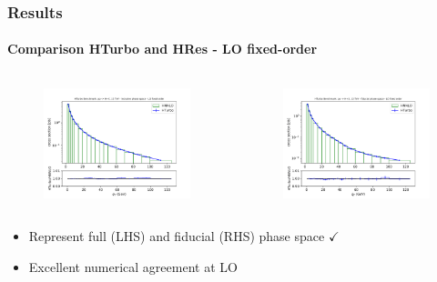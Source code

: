 \documentclass[aspectratio=43]{beamer}
\begin{document}
\begin{frame}

	\frametitle{Results}
	\framesubtitle{Comparison HTurbo and HRes - LO fixed-order}
	
	\begin{columns}
		
		
		\begin{figure}
			\includegraphics[width = 7cm]{plots/part3/chapter6/nlo-fo-1.png}
		\end{figure}
		
		
		\begin{figure}
			\includegraphics[width = 7cm]{plots/part3/chapter6/nlo-fo-fid-1.png}
		\end{figure}
		
	\end{columns}
	
	\begin{itemize}
		\item \footnotesize Represent full (LHS) and fiducial (RHS) phase space {\color{darkgreen}$\checkmark$} 
		\item \footnotesize Excellent numerical agreement at LO
	\end{itemize}

\end{frame}
\end{document}
